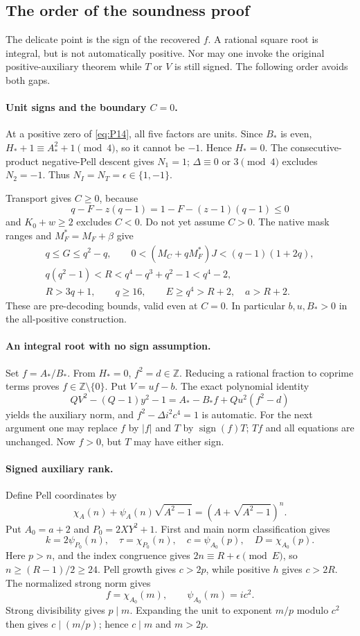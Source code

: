 \documentclass[11pt]{article}
\newcommand{\Z}{\mathbb Z}
\begin{document}
\subsection{The order of the soundness proof}

The delicate point is the sign of the recovered $f$. A rational square root is integral, but is not automatically positive. Nor may one invoke the original positive-auxiliary theorem while $T$ or $V$ is still signed. The following order avoids both gaps.

\paragraph{Unit signs and the boundary $C=0$.}
At a positive zero of \eqref{eq:P14}, all five factors are units. Since $B_*$ is even,
$H_*+1\equiv A_*^2+1\pmod4$, so it cannot be $-1$. Hence $H_*=0$.
The consecutive-product negative-Pell descent gives $N_1=1$;
$\Delta\equiv0$ or $3\pmod4$ excludes $N_2=-1$. Thus
$N_I=N_T=\epsilon\in\{1,-1\}$.

Transport gives $C\geq0$, because
\[
q-F-z(q-1)=1-F-(z-1)(q-1)\leq0
\]
and $K_0+w\geq2$ excludes $C<0$. Do not yet assume $C>0$.
The native mask ranges and $M_F^*=M_F+\beta$ give
\begin{gather}
q\leq G\leq q^2-q,\qquad
0<(M_C+qM_F^*)J<(q-1)(1+2q),\\
q(q^2-1)<R<q^4-q^3+q^2-1<q^4-2,\label{eq:weakR}\\
R>3q+1,\qquad q\geq16,\qquad E\geq q^4>R+2,\quad a>R+2.
\end{gather}
These are pre-decoding bounds, valid even at $C=0$.
In particular $b,u,B_*>0$ in the all-positive construction.

\paragraph{An integral root with no sign assumption.}
Set $f=A_*/B_*$. From $H_*=0$, $f^2=d\in\Z$. Reducing a rational fraction to coprime terms proves $f\in\Z\setminus\{0\}$. Put $V=uf-b$. The exact polynomial identity
\[
QV^2-(Q-1)y^2-1
=A_*-B_*f+Qu^2(f^2-d)
\]
yields the auxiliary norm, and $f^2-\Delta i^2c^4=1$ is automatic.
For the next argument one may replace $f$ by $|f|$ and $T$ by
$\operatorname{sign}(f)T$; $Tf$ and all equations are unchanged. Now $f>0$, but $T$ may have either sign.

\paragraph{Signed auxiliary rank.}
Define Pell coordinates by
\[
\chi_A(n)+\psi_A(n)\sqrt{A^2-1}
=(A+\sqrt{A^2-1})^n.
\]
Put $A_0=a+2$ and $P_0=2XY^2+1$. First and main norm classification gives
\[
k=2\psi_{P_0}(n),\quad \tau=\chi_{P_0}(n),\quad
c=\psi_{A_0}(p),\quad D=\chi_{A_0}(p).
\]
Here $p>n$, and the index congruence gives
$2n\equiv R+\epsilon\pmod E$, so $n\geq(R-1)/2\geq24$.
Pell growth gives $c>2p$, while positive $h$ gives $c>2R$.
The normalized strong norm gives
\[
f=\chi_{A_0}(m),\qquad \psi_{A_0}(m)=ic^2.
\]
Strong divisibility gives $p\mid m$. Expanding the unit to exponent $m/p$ modulo $c^2$ then gives $c\mid(m/p)$; hence $c\mid m$ and $m>2p$.
\end{document}
